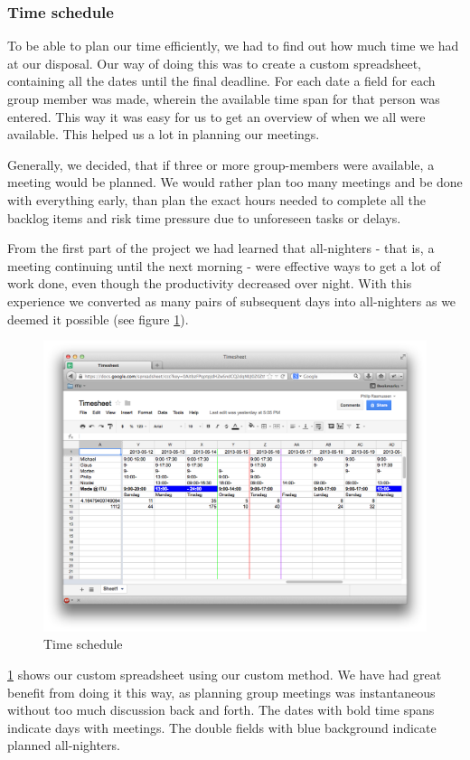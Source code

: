 \subsubsection{Time schedule}
To be able to plan our time efficiently, we had to find out how much time we had at our disposal. Our way of doing this was to create a custom spreadsheet, containing all the dates until the final deadline. For each date a field for each group member was made, wherein the available time span for that person was entered. This way it was easy for us to get an overview of when we all were available. This helped us a lot in planning our meetings.

Generally, we decided, that if three or more group-members were available, a meeting would be planned. We would rather plan too many meetings and be done with everything early, than plan the exact hours needed to complete all the backlog items and risk time pressure due to unforeseen tasks or delays.

From the first part of the project we had learned that all-nighters - that is, a meeting continuing until the next morning - were effective ways to get a lot of work done, even though the productivity decreased over night. With this experience we converted as many pairs of subsequent days into all-nighters as we deemed it possible (see figure \cref{time_schedule}).

\begin{figure}[H]
  \includegraphics[width=\textwidth]{illustrations/partialTimeSheet}
  \caption{Time schedule}
  \label{time_schedule}
\end{figure}

\cref{time_schedule} shows our custom spreadsheet using our custom method. We have had great benefit from doing it this way, as planning group meetings was instantaneous without too much discussion back and forth. The dates with bold time spans indicate days with meetings. The double fields with blue background indicate planned all-nighters.